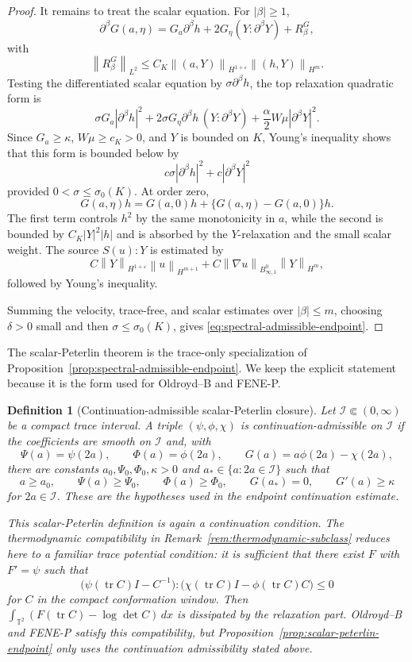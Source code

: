 \documentclass[11pt]{article}
\newtheorem{definition}{Definition}[section]
\newcommand{\T}{\mathbb T}
\newcommand{\tr}{\operatorname{tr}}
\newcommand{\eps}{\varepsilon}
\newcommand{\norm}[1]{\left\lVert #1\right\rVert}
\newcommand{\Besov}{B^0_{\infty,1}}
\begin{document}
\begin{proof}
It remains to treat the scalar equation.  For \(|\beta|\ge1\),
\[
  \partial^\beta G(a,\eta)
  =G_a\partial^\beta h+2G_\eta(Y:\partial^\beta Y)+R_\beta^G,
\]
with
\[
  \norm{R_\beta^G}_{L^2}
  \le C_K\norm{(a,Y)}_{H^{1+\eps}}\norm{(h,Y)}_{H^m}.
\]
Testing the differentiated scalar equation by
\(\sigma\partial^\beta h\), the top relaxation quadratic form is
\[
  \sigma G_a|\partial^\beta h|^2
  +2\sigma G_\eta\partial^\beta h\,(Y:\partial^\beta Y)
  +\frac{\alpha}{2}W\mu|\partial^\beta Y|^2 .
\]
Since \(G_a\ge\kappa\), \(W\mu\ge c_K>0\), and \(Y\) is bounded on \(K\), Young's
inequality shows that this form is bounded below by
\[
  c\sigma|\partial^\beta h|^2+c|\partial^\beta Y|^2
\]
provided \(0<\sigma\le\sigma_0(K)\).  At order zero,
\[
  G(a,\eta)h=G(a,0)h+\{G(a,\eta)-G(a,0)\}h .
\]
The first term controls \(h^2\) by the same monotonicity in \(a\), while the
second is bounded by \(C_K|Y|^2|h|\) and is absorbed by the \(Y\)-relaxation and
the small scalar weight.  The source \(S(u):Y\) is estimated by
\[
  C\norm{Y}_{H^{1+\eps}}\norm{u}_{H^{m+1}}
  +C\norm{\nabla u}_{\Besov}\norm{Y}_{H^m},
\]
followed by Young's inequality.

Summing the velocity, trace-free, and scalar estimates over
\(|\beta|\le m\), choosing \(\delta>0\) small and then
\(\sigma\le\sigma_0(K)\), gives \eqref{eq:spectral-admissible-endpoint}.
\end{proof}

The scalar-Peterlin theorem is the trace-only specialization of
Proposition~\ref{prop:spectral-admissible-endpoint}.  We keep the explicit
statement because it is the form used for Oldroyd--B and FENE-P.

\begin{definition}[Continuation-admissible scalar-Peterlin closure]
\label{def:admissible-scalar-peterlin}
Let \(\mathcal I\Subset(0,\infty)\) be a compact trace interval.  A triple
\((\psi,\phi,\chi)\) is continuation-admissible on \(\mathcal I\) if the
coefficients are smooth on \(\mathcal I\) and, with
\[
  \Psi(a)=\psi(2a),\qquad \Phi(a)=\phi(2a),\qquad
  G(a)=a\phi(2a)-\chi(2a),
\]
there are constants \(a_0,\Psi_0,\Phi_0,\kappa>0\) and
\(a_*\in\{a:2a\in\mathcal I\}\)
such that
\[
  a\ge a_0,\qquad \Psi(a)\ge\Psi_0,\qquad \Phi(a)\ge\Phi_0,\qquad
  G(a_*)=0,\qquad G'(a)\ge\kappa
\]
for \(2a\in\mathcal I\).  These are the hypotheses used in the endpoint
continuation estimate.

This scalar-Peterlin definition is again a continuation condition.  The
thermodynamic compatibility in Remark~\ref{rem:thermodynamic-subclass} reduces
here to a familiar trace potential condition: it is sufficient that there exist
\(F\) with \(F'=\psi\) such that
\[
  \bigl(\psi(\tr C)I-C^{-1}\bigr):
  \bigl(\chi(\tr C)I-\phi(\tr C)C\bigr)\le0
\]
for \(C\) in the compact conformation window.  Then
\(\int_{\T^2}(F(\tr C)-\log\det C)\,dx\) is dissipated by the relaxation part.
Oldroyd--B and FENE-P satisfy this compatibility, but
Proposition~\ref{prop:scalar-peterlin-endpoint} only uses the continuation
admissibility stated above.
\end{definition}
\end{document}
